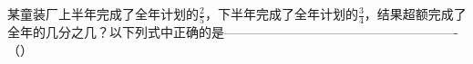 
某童装厂上半年完成了全年计划的$\frac{2}{5}$，下半年完成了全年计划的$\frac{3}{4}$，结果超额完成了全年的几分之几？以下列式中正确的是-------------------------------------------------------（\hspace{4em}）

